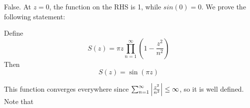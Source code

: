 \documentclass{homework}
\begin{document}
                                                                                                                                                \begin{solution}
                                                                                                                                                False. At $z=0$, the function on the RHS is 1, while $sin(0)=0$. We prove the following statement:

                                                                                                                                                \begin{lemma}

                                                                                                                                                Define
                                                                                                                                                \[
                                                                                                                                                S(z) = \pi z \displaystyle\prod_{n=1}^\infty \left( 1 - \frac{z^2}{n^2} \right)
                                                                                                                                                \]
                                                                                                                                                Then
                                                                                                                                                \[
                                                                                                                                                S(z) = \sin \left( \pi z \right)
                                                                                                                                                \]
                                                                                                                                                \end{lemma}
                                                                                                                                                This function converges everywhere since $\sum_{n=1}^\infty\left|\frac{z^2}{n^2}\right|\leq\infty$, so it is well defined.
                                                                                                                                                Note that 

\end{solution}
\end{document}

